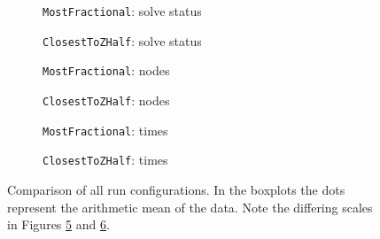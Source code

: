 \begin{figure}
	\centering

	\begin{subfigure}{0.49\textwidth}
		\centering
		
		\caption{\texttt{MostFractional}: solve status}
		\label{fig:mostfractional_solve_status}
	\end{subfigure}
	\hfill
	\begin{subfigure}{0.49\textwidth}
		\centering
		
		\caption{\texttt{ClosestToZHalf}: solve status}
		\label{fig:closesttozhalf_solve_status}
	\end{subfigure}

	\vspace{1em}

	\begin{subfigure}{0.49\textwidth}
		\centering
		
		\caption{\texttt{MostFractional}: nodes}
		\label{fig:mostfractional_nodes}
	\end{subfigure}
	\hfill
	\begin{subfigure}{0.49\textwidth}
		\centering
		
		\caption{\texttt{ClosestToZHalf}: nodes}
		\label{fig:closesttozhalf_nodes}
	\end{subfigure}

	\vspace{1em}

	\begin{subfigure}{0.49\textwidth}
		\centering
		
		\caption{\texttt{MostFractional}: times}
		\label{fig:mostfractional_times}
	\end{subfigure}
	\hfill
	\begin{subfigure}{0.49\textwidth}
		\centering
		
		\caption{\texttt{ClosestToZHalf}: times}
		\label{fig:closesttozhalf_times}
	\end{subfigure}

	\caption{Comparison of all run configurations. In the boxplots the dots represent the arithmetic mean of the data. Note the differing scales in Figures \ref{fig:mostfractional_times} and \ref{fig:closesttozhalf_times}.}
	\label{fig:comparison_general}
\end{figure}


